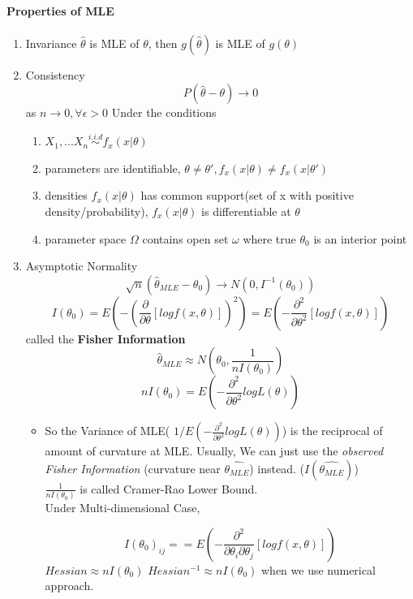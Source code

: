 \documentclass[11pt, openany]{book}              %
\begin{document}
\paragraph{Properties of MLE}
    	\begin{enumerate}
    		\item Invariance $\hat{\theta}$ is MLE of $\theta$, then $g(\hat{\theta})$ is MLE of $g(\theta)$
    		\item Consistency $$P(\hat{\theta} - \theta ) \rightarrow 0$$ as $n \rightarrow 0, \forall \epsilon > 0$ Under the conditions
    		\begin{enumerate}
    			\item $X_1,...X_n \stackrel{i.i.d}{\sim} f_x(x|\theta)$
    			\item parameters are identifiable, $\theta \neq \theta', f_x(x|\theta) \neq f_x(x|\theta')$
    			\item densities $f_x(x|\theta)$ has common support(set of x with positive density/probability), $f_x(x|\theta)$ is differentiable at $\theta$
    			\item parameter space $\Omega$ contains open set $\omega$ where true $\theta_0$ is an interior point
    		\end{enumerate}
    		\item Asymptotic Normality 
    		$$ \sqrt{n}(\hat{\theta}_{MLE} - \theta_0) \rightarrow N(0, I^{-1}(\theta_0)) $$
    		$$ I(\theta_0) = E( -(\frac{\partial}{\partial \theta} [log f(x, \theta ) ])^2)=E(-\frac{\partial^2}{\partial \theta^2} [log f(x, \theta ) ] )$$ 
    		called the \textbf{Fisher Information}
    		$$ \hat{\theta}_{MLE} \approx N(\theta_0, \frac{1}{n I(\theta_0)})$$
    		$$ n I(\theta_0) = E( -\frac{\partial^2}{\partial \theta^2} log L(\theta) )$$
    		\begin{itemize}
    		\item	So the Variance of MLE( $1/ E( -\frac{\partial^2}{\partial \theta^2} log L(\theta) )$) is the reciprocal of amount of curvature at MLE. 
    			Usually, We can just use the \textit{observed Fisher Information} (curvature near $\hat{\theta_{MLE}}$) instead. ($I(\hat{\theta_{MLE}})$) \\
    		$\frac{1}{ n I(\theta_0)}$ is called Cramer-Rao Lower Bound. \\ Under Multi-dimensional Case, 
    		
    			$$ I(\theta_0)_{ij} = =E(-\frac{\partial^2}{\partial \theta_i \partial \theta_j} [log f(x, \theta ) ] )$$ $Hessian \approx nI(\theta_0)$ $Hessian^{-1} \approx nI(\theta_0)$ when we use numerical approach. 


\end{itemize}
\end{enumerate}
\end{document}
